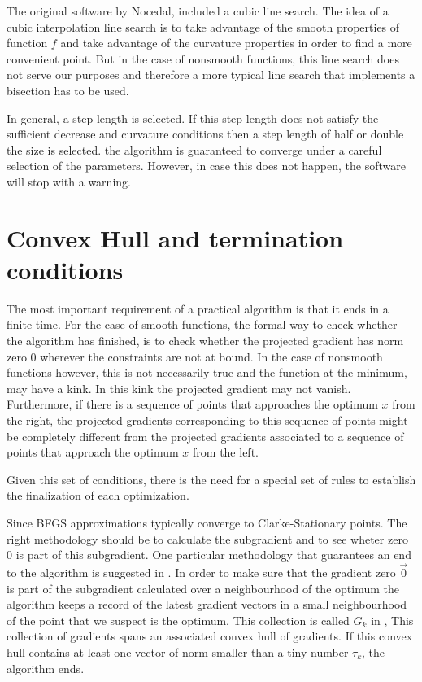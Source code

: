 The original software by Nocedal\citep{lbfgsbsoftware}, included a cubic line search. The idea of a cubic interpolation line search is to take advantage of the smooth properties of function $f$ and take advantage of the curvature properties in order to find a more convenient point. But in the case of nonsmooth functions, this line search does not serve our purposes and therefore a more typical line search that implements a bisection has to be used.

In general, a step length is selected. If this step length does not satisfy the sufficient decrease and curvature conditions then a step length of half or double the size is selected. the algorithm is guaranteed to converge under a careful selection of the parameters. However, in case this does not happen, the software will stop with a warning.

\section{Convex Hull and termination conditions}

The most important requirement of a practical algorithm is that it ends in a finite time. For the case of smooth functions, the formal way to check whether the algorithm has finished, is to check whether the projected gradient has norm zero $0$ wherever the constraints are not at bound. In the case of nonsmooth functions however, this is not necessarily true and the function at the minimum, may have a kink. In this kink the projected gradient may not vanish. Furthermore, if there is a sequence of points that approaches the optimum $x$ from the right, the projected gradients corresponding to this sequence of points might be completely different from the projected gradients associated to a sequence of points that approach the optimum $x$ from the left.

Given this set of conditions, there is the need for a special set of rules to establish the finalization of each optimization.

Since BFGS approximations typically converge to Clarke-Stationary points. The right methodology should be to calculate the subgradient and to see wheter zero $0$ is part of this subgradient. One particular methodology that guarantees an end to the algorithm is suggested in \citep{overtonlewis}. In order to make sure that the gradient zero $\vec{0}$ is part of the subgradient calculated over a neighbourhood of the optimum the algorithm keeps a record of the latest gradient vectors in a small neighbourhood of the point that we suspect is the optimum. This collection is called $G_k$ in \citep{overtonlewis}, This collection of gradients spans an associated convex hull of gradients. If this convex hull contains at least one vector of norm smaller than a tiny number $\tau_k$, the algorithm ends.

